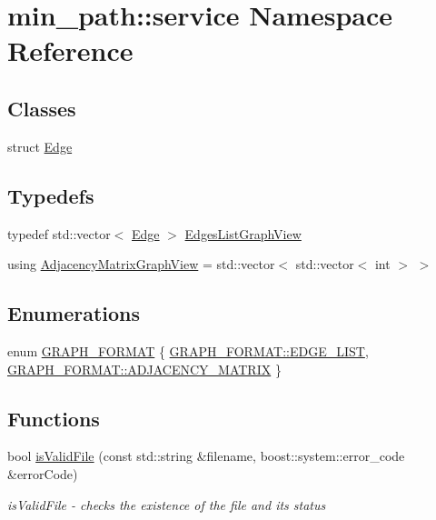\hypertarget{a00037}{}\section{min\+\_\+path\+:\+:service Namespace Reference}
\label{a00037}
\subsection*{Classes}
\begin{DoxyCompactItemize}
\item 
struct \hyperlink{a00004}{Edge}
\end{DoxyCompactItemize}
\subsection*{Typedefs}
\begin{DoxyCompactItemize}
\item 
typedef std\+::vector$<$ \hyperlink{a00004}{Edge} $>$ \hyperlink{a00037_aa7134896d837083f384364b56a32bb49_aa7134896d837083f384364b56a32bb49}{Edges\+List\+Graph\+View}
\item 
using \hyperlink{a00037_af657481a4b0a05546de6e9c1023bd9f5_af657481a4b0a05546de6e9c1023bd9f5}{Adjacency\+Matrix\+Graph\+View} = std\+::vector$<$ std\+::vector$<$ int $>$ $>$
\end{DoxyCompactItemize}
\subsection*{Enumerations}
\begin{DoxyCompactItemize}
\item 
enum \hyperlink{a00037_a1f61bb8d119aded91f38ff564193177c_a1f61bb8d119aded91f38ff564193177c}{G\+R\+A\+P\+H\+\_\+\+F\+O\+R\+M\+AT} \{ \hyperlink{a00037_a1f61bb8d119aded91f38ff564193177c_a1f61bb8d119aded91f38ff564193177ca561011d4221028551bdb4a4fdf37b7e2}{G\+R\+A\+P\+H\+\_\+\+F\+O\+R\+M\+A\+T\+::\+E\+D\+G\+E\+\_\+\+L\+I\+ST}, 
\hyperlink{a00037_a1f61bb8d119aded91f38ff564193177c_a1f61bb8d119aded91f38ff564193177ca9d8e68c3898f769422174fed0be93fd2}{G\+R\+A\+P\+H\+\_\+\+F\+O\+R\+M\+A\+T\+::\+A\+D\+J\+A\+C\+E\+N\+C\+Y\+\_\+\+M\+A\+T\+R\+IX}
 \}
\end{DoxyCompactItemize}
\subsection*{Functions}
\begin{DoxyCompactItemize}
\item 
bool \hyperlink{a00037_a57c94e914d9aaa3af892f8a74f8b23a6_a57c94e914d9aaa3af892f8a74f8b23a6}{is\+Valid\+File} (const std\+::string \&filename, boost\+::system\+::error\+\_\+code \&error\+Code)
\begin{DoxyCompactList}\small\item\em is\+Valid\+File -\/ checks the existence of the file and its status \end{DoxyCompactList}\end{DoxyCompactItemize}


